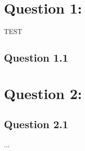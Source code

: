 \section*{Question 1:}
TEST
\subsection*{Question 1.1 }

\section*{Question 2: }

\subsection*{Question 2.1 }

...
